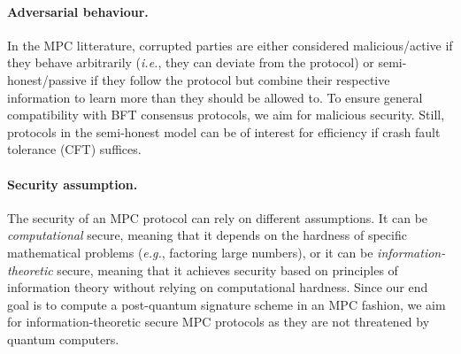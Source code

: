 \paragraph{Adversarial behaviour.}
In the MPC litterature, corrupted parties are either considered malicious/active if they behave arbitrarily (\textit{i.e.}, they can deviate from the protocol) or semi-honest/passive if they follow the protocol but combine their respective information to learn more than they should be allowed to.
To ensure general compatibility with BFT consensus protocols, we aim for malicious security.
Still, protocols in the semi-honest model can be of interest for efficiency if crash fault tolerance (CFT) suffices.

\paragraph{Security assumption.}
The security of an MPC protocol can rely on different assumptions. It can be \textit{computational} secure, meaning that it depends on the hardness of specific mathematical problems (\textit{e.g.}, factoring large numbers), or it can be \textit{information-theoretic} secure, meaning that it achieves security based on principles of information theory without relying on computational hardness.
Since our end goal is to compute a post-quantum signature scheme in an MPC fashion, we aim for information-theoretic secure MPC protocols as they are not threatened by quantum computers.
